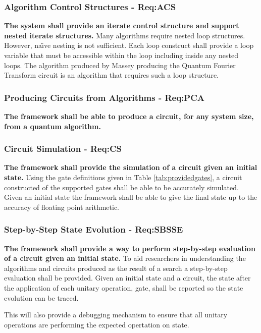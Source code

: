 \subsubsection{Algorithm Control Structures - Req:ACS}
\label{sec:reqacs}
\textbf{The system shall provide an iterate control structure and support nested iterate structures.}
Many algorithms require nested loop structures.
However, na\"{\i}ve nesting is not sufficient.
Each loop construct shall provide a loop variable that must be accessible within the loop including inside any nested loops.
The algorithm produced by Massey\cite{masseythesis} producing the Quantum Fourier Transform circuit is an algorithm that requires such a loop structure.

\subsubsection{Producing Circuits from Algorithms - Req:PCA}
\label{sec:reqpca}
\textbf{The framework shall be able to produce a circuit, for any system size, from a quantum algorithm.}

\subsubsection{Circuit Simulation - Req:CS}
\label{sec:reqcs}
\textbf{The framework shall provide the simulation of a circuit given an initial state.}
Using the gate definitions given in Table \ref{tab:providedgates}, a circuit constructed of the supported gates shall be able to be accurately simulated.
Given an initial state the framework shall be able to give the final state up to the accuracy of floating point arithmetic.

\subsubsection{Step-by-Step State Evolution - Req:SBSSE}
\label{sec:reqsbsse}
\textbf{The framework shall provide a way to perform step-by-step evaluation of a circuit given an initial state.}
To aid researchers in understanding the algorithms and circuits produced as the result of a search a step-by-step evaluation shall be provided.
Given an initial state and a circuit, the state after the application of each unitary operation, gate, shall be reported so the state evolution can be traced.

This will also provide a debugging mechanism to ensure that all unitary operations are performing the expected opertation on state.

